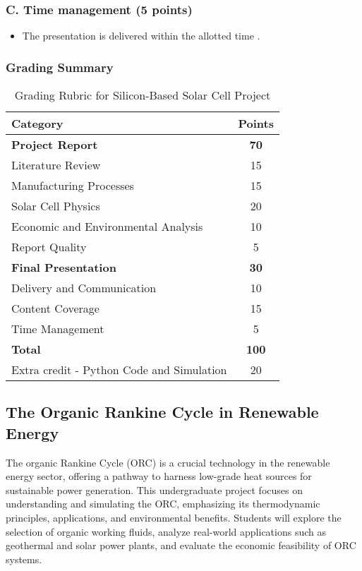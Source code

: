 \documentclass[11pt]{article}
\begin{document}
\subsubsection*{C. Time management (5 points)}
\begin{itemize}
    \item The presentation is delivered within the allotted time .
\end{itemize}
\newpage
\subsubsection*{Grading Summary}
\begin{table}[h!]
    \centering
    \begin{tabular}{|l|c|}
        \hline
        \textbf{Category} & \textbf{Points} \\
        \hline
        \textbf{Project Report} & \textbf{70} \\
        Literature Review & 15 \\
        Manufacturing Processes & 15 \\
        Solar Cell Physics & 20 \\
        Economic and Environmental Analysis & 10 \\
        Report Quality & 5 \\
        \hline
        \textbf{Final Presentation} & \textbf{30} \\
        Delivery and Communication & 10 \\
        Content Coverage & 15 \\
        Time Management & 5 \\
        \hline
        \textbf{Total} & \textbf{100} \\
        \hline
         Extra credit - Python Code and Simulation & 20 \\
         \hline
    \end{tabular}
    \caption{Grading Rubric for Silicon-Based Solar Cell Project}
\end{table}

\newpage
\subsection{The Organic Rankine Cycle in Renewable Energy}

The organic Rankine Cycle (ORC) is a crucial technology in the renewable energy sector, offering a pathway to harness low-grade heat sources for sustainable power generation. This undergraduate project focuses on understanding and simulating the ORC, emphasizing its thermodynamic principles, applications, and environmental benefits. Students will explore the selection of organic working fluids, analyze real-world applications such as geothermal and solar power plants, and evaluate the economic feasibility of ORC systems. 
\end{document}
